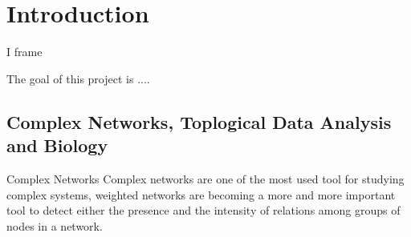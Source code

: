 \section{Introduction}
\begin{frame}{I frame}


\begin{minipage}[c]{0.65\textwidth}
The goal of this project is ....
\end{minipage}
\begin{minipage}[c]{0.25\textwidth}
\end{minipage}



\end{frame}
\subsection{Complex Networks, Toplogical Data Analysis and Biology}
\begin{frame}{Complex Networks}
Complex networks are one of the most used tool for studying complex systems, weighted networks are becoming a more and more important tool to detect either the presence and the intensity of relations among groups of nodes in a network.

\centering{
}

\end{frame}
